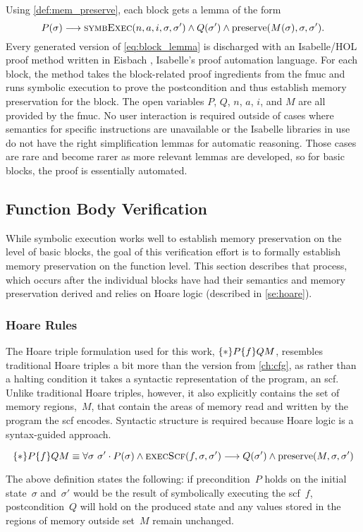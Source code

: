 Using \cref{def:mem_preserve}, each block gets a lemma of the form
\begin{equation}
  P(\sigma)\longrightarrow\operatorname{\textsc{symbExec}}(n,a,i,\sigma,\sigma')\wedge
  Q(\sigma')\wedge\operatorname{preserve}(M(\sigma),\sigma,\sigma').\label{eq:block_lemma}
\end{equation}
Every generated version of \cref{eq:block_lemma} is discharged
with an Isabelle/HOL proof method written in Eisbach \autocite{matichuk2016eisbach},
Isabelle's proof automation language.
For each block, the method takes the block-related proof ingredients
from the \ac{fmuc} and runs symbolic execution
to prove the postcondition and thus establish memory preservation for the block.
The open variables $P$, $Q$, $n$, $a$, $i$, and $M$ are all provided by the \ac{fmuc}.
No user interaction is required outside of cases where semantics
for specific instructions are unavailable or the Isabelle libraries in use
do not have the right simplification lemmas for automatic reasoning.
Those cases are rare and become rarer as more relevant lemmas are developed,
so for basic blocks, the proof is essentially automated.

\subsection{Function Body Verification}
While symbolic execution works well to establish memory preservation on the level of basic blocks,
the goal of this verification effort is to formally establish memory preservation
on the function level. This section describes that process,
which occurs after the individual blocks have had their semantics and memory preservation derived
and relies on Hoare logic (described in \cref{se:hoare}).

\subsubsection{Hoare Rules}\label{scf_hoare}
The Hoare triple formulation used for this work, $\{*\}P\{f\}{Q}M$,
resembles traditional Hoare triples a bit more than the version from \cref{ch:cfg},%
as rather than a halting condition
it takes a syntactic representation of the program, an \ac{scf}.
Unlike traditional Hoare triples, however,
it also explicitly contains the set of memory regions,~$M$,
that contain the areas of memory read and written by the program the \ac{scf} encodes.
Syntactic structure is required because Hoare logic is a syntax-guided approach.
\begin{definition}\label{def:preserve}
  \begin{equation}
    \{*\}P\{f\}{Q}{M}\equiv
    \forall\sigma~\sigma'\cdot P(\sigma)\wedge\operatorname{\textsc{execScf}}(f,\sigma,\sigma')\longrightarrow
    Q(\sigma')\wedge\operatorname{preserve}(M,\sigma,\sigma')
  \end{equation}
\end{definition}
The above definition states the following:
if precondition~$P$ holds on the initial state~$\sigma$
and~$\sigma'$ would be the result of symbolically executing the \ac{scf}~$f$,
postcondition~$Q$ will hold on the produced state
and any values stored in the regions of memory outside set~$M$ remain unchanged.

